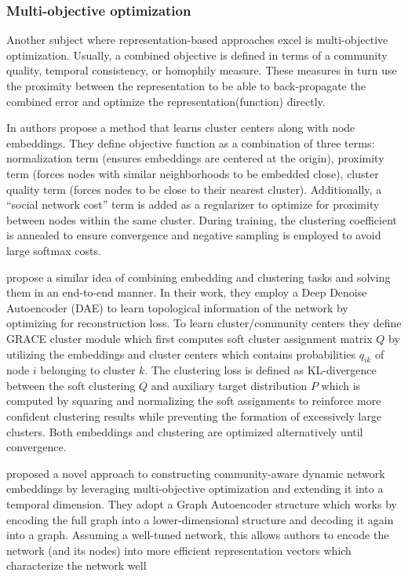 \documentclass[
acmsmall,
nonacm,
screen,
acmthm]{../../scripts/pandoc/templates/acmart}
\begin{document}
\hypertarget{multi-objective-optimization}{%
\subsubsection{Multi-objective
optimization}\label{multi-objective-optimization}}

Another subject where representation-based approaches excel is
multi-objective optimization. Usually, a combined objective is defined
in terms of a community quality, temporal consistency, or homophily
measure. These measures in turn use the proximity between the
representation to be able to back-propagate the combined error and
optimize the representation(function) directly.

In \citet{rozemberczkiGEMSECGraphEmbedding2019} authors propose a method
that learns cluster centers along with node embeddings. They define
objective function as a combination of three terms: normalization term
(ensures embeddings are centered at the origin), proximity term (forces
nodes with similar neighborhoods to be embedded close), cluster quality
term (forces nodes to be close to their nearest cluster). Additionally,
a ``social network cost'' term is added as a regularizer to optimize for
proximity between nodes within the same cluster. During training, the
clustering coefficient is annealed to ensure convergence and negative
sampling is employed to avoid large softmax costs.

\citet{yangGraphClusteringDynamic2017} propose a similar idea of
combining embedding and clustering tasks and solving them in an
end-to-end manner. In their work, they employ a Deep Denoise Autoencoder
(DAE) to learn topological information of the network by optimizing for
reconstruction loss. To learn cluster/community centers they define
GRACE cluster module which first computes soft cluster assignment matrix
\(Q\) by utilizing the embeddings and cluster centers which contains
probabilities \(q_{ik}\) of node \(i\) belonging to cluster \(k\). The
clustering loss is defined as KL-divergence between the soft clustering
\(Q\) and auxiliary target distribution \(P\) which is computed by
squaring and normalizing the soft assignments to reinforce more
confident clustering results while preventing the formation of
excessively large clusters. Both embeddings and clustering are optimized
alternatively until convergence.

\citet{maCommunityawareDynamicNetwork2020} proposed a novel approach to
constructing community-aware dynamic network embeddings by leveraging
multi-objective optimization and extending it into a temporal dimension.
They adopt a Graph Autoencoder structure which works by encoding the
full graph into a lower-dimensional structure and decoding it again into
a graph. Assuming a well-tuned network, this allows authors to encode
the network (and its nodes) into more efficient representation vectors
which characterize the network well
\end{document}

